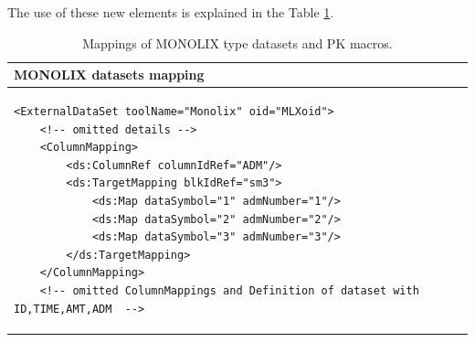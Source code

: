 The use of these new elements is explained in the Table \ref{tab:mappingNONMEMAndMacros}. 
\begin{table}[ht!]
\setlength{\tabcolsep}{5pt}
\centering
\begin{tabular}{l}
  \hline
  \hline
MONOLIX datasets mapping \\ %
  \hline
\lstset{language=XML}
\begin{lstlisting}
<ExternalDataSet toolName="Monolix" oid="MLXoid">
    <!-- omitted details -->
    <ColumnMapping>
        <ds:ColumnRef columnIdRef="ADM"/>
        <ds:TargetMapping blkIdRef="sm3">
            <ds:Map dataSymbol="1" admNumber="1"/>
            <ds:Map dataSymbol="2" admNumber="2"/>
            <ds:Map dataSymbol="3" admNumber="3"/>
        </ds:TargetMapping>
    </ColumnMapping>
    <!-- omitted ColumnMappings and Definition of dataset with ID,TIME,AMT,ADM  -->
\end{lstlisting}
%    
%    
%    
%    
\\
    \hline
\end{tabular}
\caption{Mappings of MONOLIX type datasets and PK macros.}
\label{tab:mappingNONMEMAndMacros}
\end{table}



